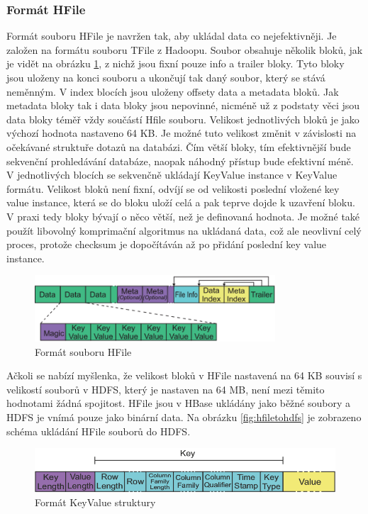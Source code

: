 \documentclass[thesis=M,czech]{FITthesis}[2012/06/26]
\begin{document}
\subsubsection{Formát HFile}
Formát souboru HFile je navržen tak, aby ukládal data co nejefektivněji. Je založen na formátu souboru TFile z Hadoopu. Soubor obsahuje několik bloků, jak je vidět na obrázku \ref{fig:hfile}, z nichž jsou fixní pouze info a trailer bloky. Tyto bloky jsou uloženy na konci souboru a ukončují tak daný soubor, který se stává neměnným. V index blocích jsou uloženy offsety data a metadata bloků. Jak metadata bloky tak i data bloky jsou nepovinné, nicméně už z podstaty věci jsou data bloky téměř vždy součástí Hfile souboru. Velikost jednotlivých bloků je jako výchozí hodnota nastaveno 64 KB. Je možné tuto velikost změnit v závislosti na očekávané struktuře dotazů na databázi. Čím větší bloky, tím efektivnější bude sekvenční prohledávání databáze, naopak náhodný přístup bude efektivní méně. V jednotlivých blocích se sekvenčně ukládají KeyValue instance v KeyValue formátu. Velikost bloků není fixní, odvíjí se od velikosti poslední vložené key value instance, která se do bloku uloží celá a pak teprve dojde k uzavření bloku. V praxi tedy bloky bývají o něco větší, než je definovaná hodnota. Je možné také použít libovolný komprimační algoritmus na ukládaná data, což ale neovlivní celý proces, protože checksum je dopočítáván až po přidání poslední key value instance.
\begin{figure}[h]\centering
	\includegraphics[width=0.8\textwidth, angle=0]{files/HFile}
	\caption[Formát souboru HFile]{Formát souboru HFile}\label{fig:hfile}
\end{figure}


Ačkoli se nabízí myšlenka, že velikost bloků v HFile nastavená na 64 KB souvisí s velikostí souborů v HDFS, který je nastaven na 64 MB, není mezi těmito hodnotami žádná spojitost. HFile jsou v HBase ukládány jako běžné soubory a HDFS je vnímá pouze jako binární data. Na obrázku \ref{fig:hfiletohdfs} je zobrazeno schéma ukládání HFile souborů do HDFS.

\begin{figure}[h]\centering
	\includegraphics[width=1\textwidth, angle=0]{files/key-value}
	\caption[Formát KeyValue struktury]{Formát KeyValue struktury}\label{fig:keyvalue}
\end{figure}
\end{document}
